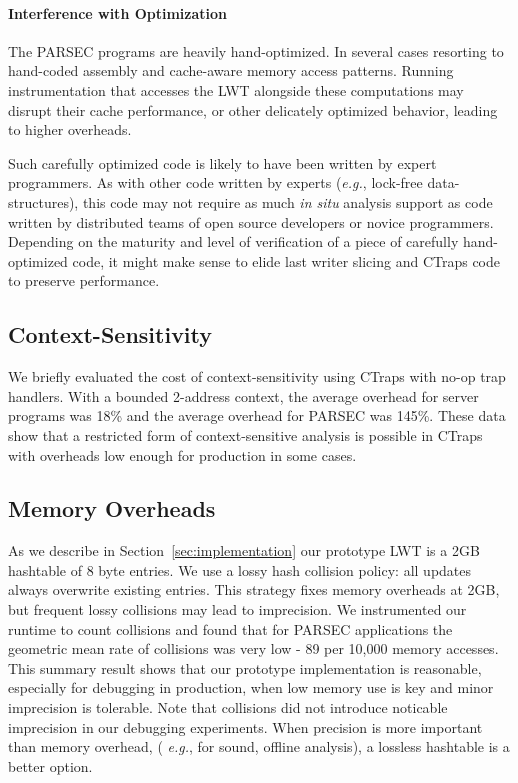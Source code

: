 \documentclass[preprint,10pt]{sigplanconf}
\newcommand{\ctraps}{CTraps\xspace}
\newcommand{\lwt}{LWT\xspace}
\begin{document}
\paragraph{Interference with Optimization}
The PARSEC programs are heavily hand-optimized. In several cases
resorting to hand-coded assembly and cache-aware memory access patterns.
Running instrumentation that accesses the \lwt alongside these computations may
disrupt their cache performance, or other delicately optimized behavior,
leading to higher overheads.  

Such carefully optimized code is likely to have been written by expert
programmers.  As with other code written by experts ({\em e.g.}, lock-free
data-structures), this code may not require as much {\em in situ} analysis
support as code written by distributed teams of open source developers or
novice programmers.  Depending on the maturity and level of verification of a
piece of carefully hand-optimized code, it might make sense to elide 
last writer slicing and \ctraps code to preserve performance. 
 

\subsection{Context-Sensitivity}
We briefly evaluated the cost of context-sensitivity using \ctraps with no-op
trap handlers.  With a bounded 2-address context, the average overhead for
server programs was 18\% and the average overhead for PARSEC was 145\%.  These
data show that a restricted form of context-sensitive analysis is possible in
\ctraps with overheads low enough for production in some cases.

\subsection{Memory Overheads}
\label{sec:eval:performance:collisions}
As we describe in Section~\ref{sec:implementation} our prototype \lwt is a 2GB
hashtable of 8 byte entries.  We use a lossy hash collision policy: all updates
always overwrite existing entries.  This strategy fixes memory overheads at
2GB, but frequent lossy collisions may lead to imprecision.   We instrumented
our runtime to count collisions and found that for PARSEC applications the
geometric mean rate of collisions was very low - 89 per 10,000 memory accesses.
This summary result shows that our prototype implementation is reasonable,
especially for debugging in production, when low memory use is key and minor
imprecision is tolerable.  Note that collisions did not introduce noticable
imprecision in our debugging experiments.  When precision is more important than memory overhead, ({\em
e.g.}, for sound, offline analysis), a lossless hashtable is a better option.  
\end{document}
